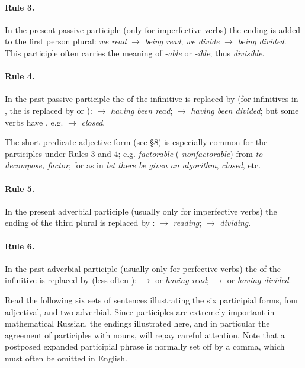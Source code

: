 \paragraph{Rule 3.} In the present passive participle (only for imperfective verbs) the ending  is added to the first person plural:  \emph{we read} \(\to\)  \emph{being read};  \emph{we divide} \(\to\)  \emph{being divided}. This participle often carries the meaning of \emph{-able} or \emph{-ible}; thus  \emph{divisible}.

\paragraph{Rule 4.} In the past passive participle the  of the infinitive is replaced by  (for infinitives in , the  is replaced by  or ):  \(\to\)  \emph{having been read};  \(\to\)  \emph{having been divided}; but some verbs have , e.g.  \(\to\)  \emph{closed}.

The short predicate-adjective form (see §8) is especially common for the participles under Rules 3 and 4; e.g.  \emph{factorable} ( \emph{nonfactorable}) from  \emph{to decompose, factor};  for  as in  \emph{let there be given an algorithm},  \emph{closed}, etc.

\paragraph{Rule 5.} In the present adverbial participle (usually only for imperfective verbs) the ending of the third plural is replaced by :  \(\to\)  \emph{reading};  \(\to\)  \emph{dividing}.

\paragraph{Rule 6.} In the past adverbial participle (usually only for perfective verbs) the  of the infinitive is replaced by  (less often ):  \(\to\)  or  \emph{having read};  \(\to\)  or  \emph{having divided}.

\begin{keybox}[Exercise 3.9]
Read the following six sets of sentences illustrating the six participial forms, four adjectival, and two adverbial. Since participles are extremely important in mathematical Russian, the endings illustrated here, and in particular the agreement of participles with nouns, will repay careful attention. Note that a postposed expanded participial phrase is normally set off by a comma, which must often be omitted in English.
\end{keybox}


